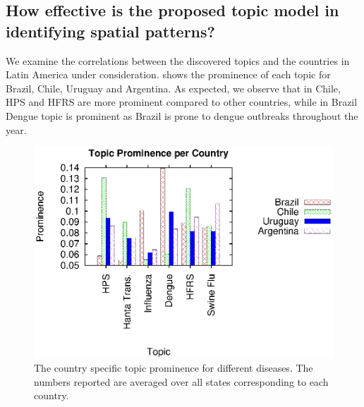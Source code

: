 \documentclass[twoside,leqno,twocolumn]{article}
\begin{document}
\vspace{-10pt}
\subsection{How effective is the proposed topic model in identifying spatial patterns?} 
\label{sec:spatial}
We examine the correlations between the discovered topics and the countries in Latin America under consideration.  shows the prominence of each topic for Brazil, Chile, Uruguay and Argentina. As expected, we observe that in Chile, HPS and HFRS are more prominent compared to other countries, while in Brazil Dengue topic is prominent as Brazil is prone to dengue outbreaks throughout the year.

\vspace{-10pt}
\begin{figure}[h]
\captionsetup{font=scriptsize}
\begin{center}
	\includegraphics[trim=5 0 10 10, clip,scale=0.6]{fig/country_topic.eps}
\end{center}
 \vspace{-10pt}
\caption{The country specific topic prominence for different diseases. The numbers reported are averaged over all states corresponding to each country.}
 \label{fig:country_topic}
 \vspace{-10pt}
\end{figure}
\end{document}
